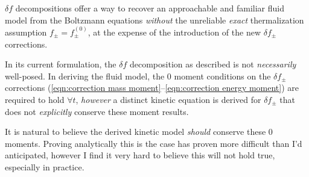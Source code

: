     $\delta\!f$ decompositions offer a way to recover an approachable and familiar fluid model from the Boltzmann equations \emph{without} the unreliable \emph{exact} thermalization assumption $f_{\pm}  =  f_{\pm}^{(0)}$, at the expense of the introduction of the new $\delta\!f_{\pm}$ corrections.

    \line

    In its current formulation, the $\delta\!f$ decomposition as described is not \emph{necessarily} well-posed. In deriving the fluid model, the 0 moment conditions on the $\delta\!f_{\pm}$ corrections (\ref{eqn:correction mass moment}--\ref{eqn:correction energy moment}) are required to hold $\forall t$, \emph{however} a distinct kinetic equation is derived for $\delta\!f_{\pm}$ that does not \emph{explicitly} conserve these moment results.

    \begin{remark}
        It is natural to believe the derived kinetic model \emph{should} conserve these 0 moments. Proving analytically this is the case has proven more difficult than I'd anticipated, however I find it very hard to believe this will not hold true, especially in practice.
    \end{remark}

